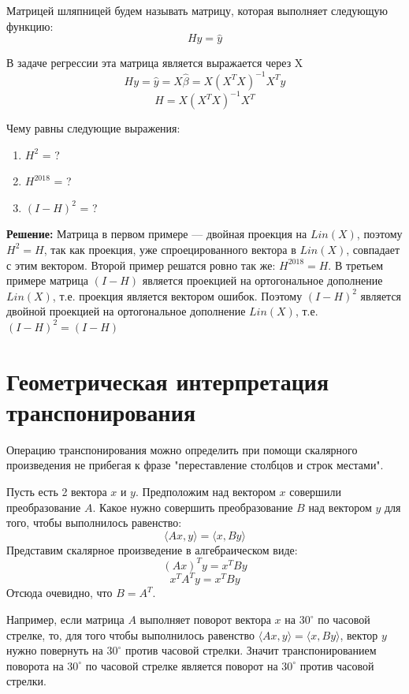 \documentclass[12pt]{article} %
\theoremstyle{definition} %
\def \hb{\hat{\beta}}
\def \hy{\hat{y}}
\begin{document}
Матрицей шляпницей будем называть матрицу, которая выполняет следующую функцию:
\[
Hy=\hy
\]

В задаче регрессии эта матрица является выражается через X
\[
Hy=\hy=X\hb = X(X^T X)^{-1}X^Ty
\]
\[
H = X(X^T X)^{-1}X^T
\]

Чему равны следующие выражения:
\begin{enumerate}
    \item $H^2$ = ?
    \item $H^{2018}$ = ?
    \item $(I-H)^2$ = ?
\end{enumerate}

\textbf{Решение:}
Матрица в первом примере — двойная проекция на $Lin(X)$, поэтому $H^2 = H$, так как проекция, уже спроецированного вектора в $Lin(X)$, совпадает с этим вектором. Второй пример решатся ровно так же: $H^{2018}=H$. В третьем примере матрица $(I-H)$ является проекцией на ортогональное дополнение $Lin(X)$, т.е. проекция является вектором ошибок. Поэтому $(I-H)^2$ является двойной проекцией на ортогональное дополнение $Lin(X)$, т.е. $(I-H)^2=(I-H)$

\section{Геометрическая интерпретация транспонирования}

Операцию транспонирования можно определить при помощи скалярного произведения не прибегая к фразе "переставление столбцов и строк местами".

Пусть есть 2 вектора $x$ и $y$. Предположим над вектором $x$ совершили преобразование $A$. Какое нужно совершить преобразование $B$ над вектором $y$ для того, чтобы выполнилось равенство:
\[
\langle Ax,y \rangle =\langle x,By \rangle
\]
Представим скалярное произведение в алгебраическом виде:
\[
(Ax)^Ty=x^TBy
\]
\[
x^TA^Ty=x^TBy
\]
Отсюда очевидно, что $B=A^T$.

Например, если матрица $A$ выполняет поворот вектора $x$ на $30^{\circ}$ по часовой стрелке, то,
для того чтобы выполнилось равенство $\langle Ax,y \rangle =\langle x,By \rangle$, вектор $y$ нужно повернуть на $30^{\circ}$ против часовой стрелки.
Значит транспонированием поворота на $30^{\circ}$ по часовой стрелке является поворот на $30^{\circ}$ против часовой стрелки.
\end{document}
